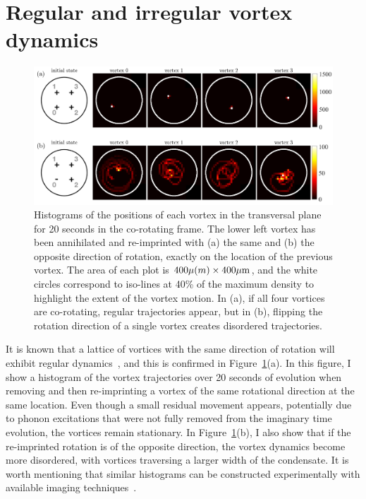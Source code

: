 \section{Regular and irregular vortex dynamics}

\begin{figure}
\includegraphics[width=\textwidth]{data/2d/histogram/histogram}

\caption{
Histograms of the positions of each vortex in the transversal plane for 20 seconds in the co-rotating frame.
The lower left vortex has been annihilated and re-imprinted with (a) the same and (b) the opposite direction of rotation, exactly on the location of the previous vortex.
The area of each plot is $400\mu \text(m) \times 400 \mu \text{m}$, and the white circles correspond to iso-lines at 40\% of the maximum density to highlight the extent of the vortex motion.
In (a), if all four vortices are co-rotating, regular trajectories appear, but in (b), flipping the rotation direction of a single vortex creates disordered trajectories.
}
\label{fig:histogram}
\end{figure}

It is known that a lattice of vortices with the same direction of rotation will exhibit regular dynamics~\cite{abo2001}, and this is confirmed in Figure~\ref{fig:histogram}(a).
In this figure, I show a histogram of the vortex trajectories over 20 seconds of evolution when removing and then re-imprinting a vortex of the same rotational direction at the same location.
Even though a small residual movement appears, potentially due to phonon excitations that were not fully removed from the imaginary time evolution, the vortices remain stationary.
In Figure~\ref{fig:histogram}(b), I also show that if the re-imprinted rotation is of the opposite direction, the vortex dynamics become more disordered, with vortices traversing a larger width of the condensate.
It is worth mentioning that similar histograms can be constructed experimentally with available imaging techniques~\cite{wilson2015,freilich2010}.

